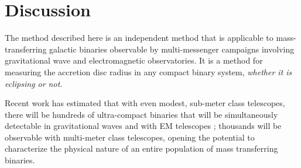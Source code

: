 \documentclass[preprint2]{aastex}
\newcommand{\note}[1]{[$\blacktriangleright$~\textbf{#1}~$\blacktriangleleft$]}
\begin{document}






\section{Discussion}\label{sec.discussion}
The method described here is an independent method that is applicable
to mass-transferring galactic binaries observable by multi-messenger
campaigns involving gravitational wave and electromagnetic
observatories.  It is a method for measuring the accretion disc radius
in any compact binary system, \textit{whether it is eclipsing or not.}

Recent work has estimated that with even modest, sub-meter class 
telescopes, there will be hundreds of ultra-compact binaries that 
will be simultaneously detectable in gravitational waves and with EM 
telescopes \citep{LLCN2013}; thousands will be observable with 
multi-meter class telescopes, opening the potential to characterize 
the physical nature of an entire population of mass transferring 
binaries.
\end{document}
